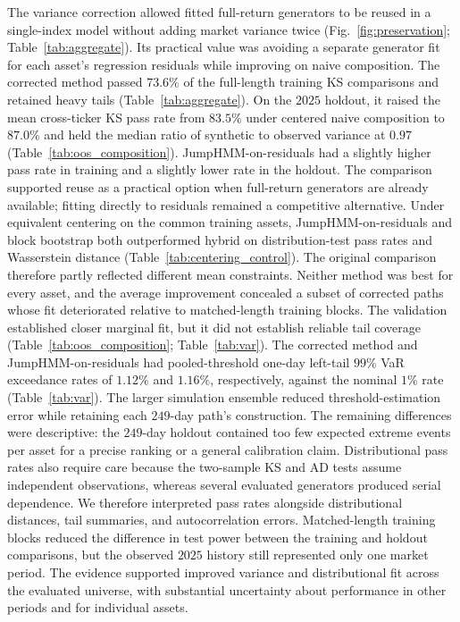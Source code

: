 The variance correction allowed fitted full-return generators to be
reused in a single-index model without adding market variance twice
(Fig.~\ref{fig:preservation}; Table~\ref{tab:aggregate}).
Its practical value was avoiding a separate generator fit for each
asset's regression residuals while improving on naive composition. The corrected method passed $73.6\%$ of the full-length training
KS comparisons and retained heavy tails (Table~\ref{tab:aggregate}).
On the $2025$ holdout, it raised the mean cross-ticker KS pass rate
from $83.5\%$ under centered naive composition to $87.0\%$ and held
the median ratio of synthetic to observed variance at $0.97$
(Table~\ref{tab:oos_composition}). JumpHMM-on-residuals had a slightly
higher pass rate in training and a slightly lower rate in the holdout.
The comparison supported reuse as a practical option when full-return
generators are already available; fitting directly to residuals
remained a competitive alternative. Under equivalent centering on the
common training assets, JumpHMM-on-residuals and block bootstrap both
outperformed hybrid on distribution-test pass rates and Wasserstein
distance (Table~\ref{tab:centering_control}). The original comparison
therefore partly reflected different mean constraints. Neither method
was best for every asset, and the average improvement concealed a subset of corrected
paths whose fit deteriorated relative to matched-length training
blocks.
The validation established closer marginal fit, but it did not establish
reliable tail coverage (Table~\ref{tab:oos_composition};
Table~\ref{tab:var}). The corrected method and JumpHMM-on-residuals
had pooled-threshold one-day left-tail $99\%$ VaR exceedance rates
of $1.12\%$ and $1.16\%$, respectively, against the nominal $1\%$
rate (Table~\ref{tab:var}). The larger simulation ensemble reduced
threshold-estimation error while retaining each $249$-day path's
construction. The remaining differences were descriptive: the
$249$-day holdout contained too few expected extreme events per
asset for a precise ranking or a general calibration claim. Distributional pass rates also require care because
the two-sample KS and AD tests assume independent observations,
whereas several evaluated generators produced serial dependence. We
therefore interpreted pass rates alongside distributional distances,
tail summaries, and autocorrelation errors. Matched-length training
blocks reduced the difference in test power between the training and
holdout comparisons, but the observed $2025$ history still represented
only one market period. The evidence supported improved variance and
distributional fit across the evaluated universe, with substantial
uncertainty about performance in other periods and for individual
assets.

